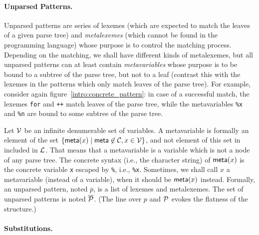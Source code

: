 \paragraph{Unparsed Patterns.}
Unparsed patterns are series of lexemes (which are expected to match
the leaves of a given parse tree) and \emph{meta\-lexemes} (which
cannot be found in the programming language) whose purpose is to
control the matching process. Depending on the matching, we shall have
different kinds of meta\-lexemes, but all unparsed patterns can at
least contain \emph{meta\-variables} whose purpose is to be bound to a
subtree of the parse tree, but not to a leaf (contrast this with the
lexemes in the patterns which only match leaves of the parse
tree). For example, consider again
figure~\ref{intro:concrete_pattern}: in case of a successful match,
the lexemes \texttt{for} and \texttt{++} match leaves of the parse
tree, while the meta\-variables \texttt{\%x} and \texttt{\%n} are
bound to some subtree of the parse tree.

Let \({\cal V}\) be an infinite denumerable set of variables. A
meta\-variable is formally an element of the set \(\{\textsf{meta}(x) \mid
\textsf{meta} \not\in {\cal C}, x \in {\cal V}\}\), and not element of
this set in included in \({\cal L}\). That means that a meta\-variable
is a variable which is not a node of any parse tree. The concrete
syntax (i.e., the character string) of \(\textsf{meta}(x)\) is the concrete
variable \texttt{x} escaped by \texttt{\%}, i.e.,
\texttt{\%x}. Sometimes, we shall call \(x\) a meta\-variable (instead
of a variable), when it should be \(\textsf{meta}(x)\) instead. Formally, an
unparsed pattern, noted \(\overline{p}\), is a list of lexemes and
meta\-lexemes. The set of unparsed patterns is noted \(\overline{\cal
P}\). (The line over \(p\) and \(\cal P\) evokes the flatness of the
structure.)

\paragraph{Substitutions.}

